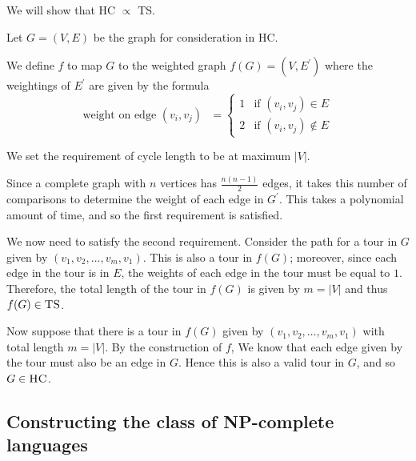 


\begin{example}
    We will show that \textsc{HC} $\propto$ \textsc{TS}.

    Let $G=(V,E)$ be the graph for consideration in \textsc{HC}.
    
    We define $f$ to map $G$ to the weighted graph $f(G)=(V,E^{\prime})$ where the weightings of $E^{\prime}$ are given by the formula
    \begin{equation*}
        \text{weight on edge $(v_i,v_j)$ } =
        \begin{cases}
            1 & \text{if } (v_i,v_j) \in E\\
            2 & \text{if } (v_i,v_j) \notin E
        \end{cases}
    \end{equation*}

    We set the requirement of cycle length to be at maximum $|V|$.
    
    Since a complete graph with $n$ vertices has \(\frac{n(n-1)}{2}\) edges, it takes this number of comparisons to determine the weight of each edge in $G^{\prime}$. This takes a polynomial amount of time, and so the first requirement is satisfied.

    We now need to satisfy the second requirement. Consider the path for a tour in $G$  given by \((v_1,v_2,\dots,v_m,v_1)\). This is also a tour in $f(G)$; moreover, since each edge in the tour is in $E$, the weights of each edge in the tour must be equal to $1$. Therefore, the total length of the tour in $f(G)$ is given by $m = |V|$ and thus \(f(G) \in  \text{\textsc{TS}}\).

    Now suppose that there is a tour in \(f(G)\) given by \((v_1,v_2,\dots,v_m,v_1)\) with total length $m=|V|$. By the construction of $f$, We know that each edge given by the tour must also be an edge in $G$. Hence this is also a valid tour in $G$, and so $G \in \text{\textsc{HC}}$.
    
\end{example}

\newpage
\subsection{Constructing the class of NP-complete languages}

